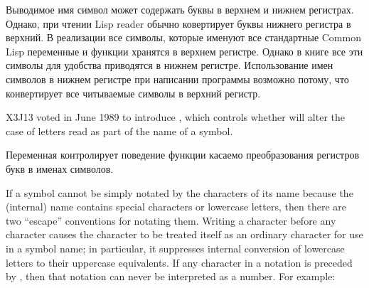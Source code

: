 Выводимое имя символ может содержать буквы в верхнем и нижнем регистрах.
Однако, при чтении Lisp reader обычно ковертирует буквы нижнего регистра в
верхний.
В реализации все символы, которые именуют все стандартные Common Lisp переменные
и функции хранятся в верхнем регистре. Однако в книге все эти символы для
удобства приводятся в нижнем регистре. Использование имен символов в нижнем
регистре при написании программы возможно потому, что  конвертирует все
читываемые символы в верхний регистр.

\begin{newer}
X3J13 voted in June 1989  to introduce
, which controls whether  will alter the case
of letters read as part of the name of a symbol.

Переменная  контролирует поведение функции 
касаемо преобразования регистров букв в именах символов.
\end{newer}

If a symbol cannot be simply notated by the characters of its name
because the (internal) name contains special characters or lowercase letters,
then there are two ``escape'' conventions for notating them.
Writing a \cd{{\Xbackslash}} character before any character causes the character
to be treated itself as an ordinary character for use in a symbol name;
in particular, it suppresses internal conversion of lowercase letters
to their uppercase equivalents.
If any character in a notation is preceded by \cd{{\Xbackslash}}, then that
notation can never be interpreted as a number.
For example:

